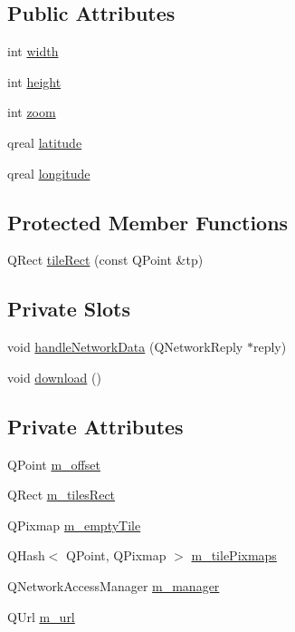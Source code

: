 \subsection*{Public Attributes}
\begin{DoxyCompactItemize}
\item 
int \hyperlink{classSlippyMap_ada3532095a8c4083e9da3db17de29fc1}{width}
\item 
int \hyperlink{classSlippyMap_aacec4be5e2b83eb2744a3b3b03c4af7a}{height}
\item 
int \hyperlink{classSlippyMap_a13dcc9915570a1a333c1e9275ffe64b3}{zoom}
\item 
qreal \hyperlink{classSlippyMap_a223220fdcbf2197845f009d48225c0c8}{latitude}
\item 
qreal \hyperlink{classSlippyMap_af93efe003c192b7bc6a1ece6c7342de6}{longitude}
\end{DoxyCompactItemize}
\subsection*{Protected Member Functions}
\begin{DoxyCompactItemize}
\item 
Q\-Rect \hyperlink{classSlippyMap_ada0e611fc8d684f9255236237105508d}{tile\-Rect} (const Q\-Point \&tp)
\end{DoxyCompactItemize}
\subsection*{Private Slots}
\begin{DoxyCompactItemize}
\item 
void \hyperlink{classSlippyMap_af069a885b3750deed3ebf1f992426753}{handle\-Network\-Data} (Q\-Network\-Reply $\ast$reply)
\item 
void \hyperlink{classSlippyMap_a25dc08d50224b8aa392adbaa1667bbc1}{download} ()
\end{DoxyCompactItemize}
\subsection*{Private Attributes}
\begin{DoxyCompactItemize}
\item 
Q\-Point \hyperlink{classSlippyMap_a705bb1600f5003868b890f1e25a198a6}{m\-\_\-offset}
\item 
Q\-Rect \hyperlink{classSlippyMap_aa8154d798c574c1d6ed89f3347835a76}{m\-\_\-tiles\-Rect}
\item 
Q\-Pixmap \hyperlink{classSlippyMap_a0021bf8f7ecbaa61bd47f8f0a36ea9d0}{m\-\_\-empty\-Tile}
\item 
Q\-Hash$<$ Q\-Point, Q\-Pixmap $>$ \hyperlink{classSlippyMap_a2c88805d8030caedb95af10ce5d95aae}{m\-\_\-tile\-Pixmaps}
\item 
Q\-Network\-Access\-Manager \hyperlink{classSlippyMap_a7df40e5af7c39bca00ce51f69e68ce57}{m\-\_\-manager}
\item 
Q\-Url \hyperlink{classSlippyMap_a3b265edb8c33bc1ff185cf081ea0fdaa}{m\-\_\-url}
\end{DoxyCompactItemize}


